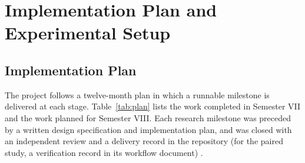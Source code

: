 \onehalfspacing
\pagestyle{fancy}
\fancyhf{}
\renewcommand{\headrulewidth}{0pt}
\cfoot{\thepage}
\chapter{Implementation Plan and Experimental Setup}

\section{Implementation Plan}
\noindent The project follows a twelve-month plan in which a runnable milestone is delivered at each stage. Table~\ref{tab:plan} lists the work completed in Semester VII and the work planned for Semester VIII. Each research milestone was preceded by a written design specification and implementation plan, and was closed with an independent review and a delivery record in the repository (for the paired study, a verification record in its workflow document) \cite{repo}.

